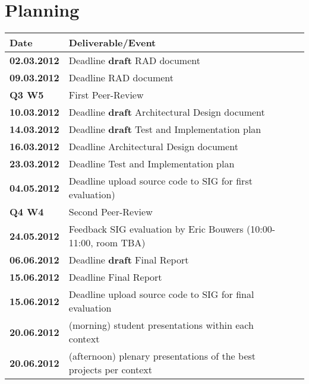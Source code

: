 \documentclass[a4paper]{article}
\begin{document}
\section{Planning}  %
\begin{tabular}{llll}
\textbf{Date}   &Deliverable/Event\\\hline
\textbf{02.03.2012}      &Deadline \textbf{draft} RAD document\\\hline
\textbf{09.03.2012}      &Deadline RAD document\\\hline
\textbf{Q3 W5}           &First Peer-Review\\\hline
\textbf{10.03.2012 }     &Deadline \textbf{draft} Architectural Design document\\\hline
\textbf{14.03.2012 }     &Deadline \textbf{draft} Test and Implementation plan\\\hline
\textbf{16.03.2012 }     &Deadline Architectural Design document\\\hline
\textbf{23.03.2012 }     &Deadline Test and Implementation plan\\\hline
\textbf{04.05.2012}      &Deadline upload source code to SIG for first evaluation)\\\hline
\textbf{Q4 W4 }          &Second Peer-Review\\\hline
\textbf{24.05.2012}      &Feedback SIG evaluation by Eric Bouwers (10:00-11:00, room TBA)\\\hline
\textbf{06.06.2012}      &Deadline \textbf{draft} Final Report\\\hline
\textbf{15.06.2012}      &Deadline Final Report\\\hline
\textbf{15.06.2012}      &Deadline upload source code to SIG for final evaluation\\\hline
\textbf{20.06.2012}      &(morning)    student presentations within each context\\\hline
\textbf{20.06.2012}      &(afternoon)  plenary presentations of the best projects per context\\\hline
\end{tabular}
\pagebreak
\end{document}
